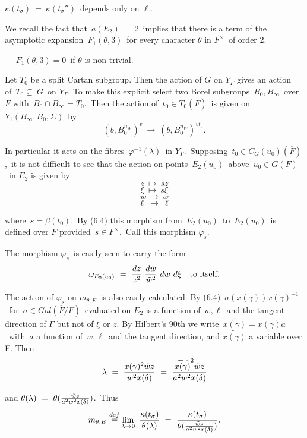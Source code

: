 \noindent $\kappa(t_\sigma)\ =\ \kappa(t_\sigma'')$\  depends only on
$\ell$.


We recall the fact that\ $a(E_2)\ =\ 2$\  implies that there is a term of the
asymptotic expansion\ $F_1(\theta, 3)$\  for every character $\theta$ in  $F^\times$\
of order 2.		    

\pagebreak
{}~~ $F_1(\theta,3) = 0$\  if  $\theta$  is non-trivial.
\endproclaim

  Let  $T_0$  be a split Cartan subgroup.  Then the action of  $G$ on
$Y_\Gamma$  gives an action of\ $T_0\subseteq\ G$\  on  $Y_\Gamma$.  To make this
explicit select two Borel subgroups\ $B_0,B_\infty$\  over  $F$  with\
$B_0 \cap B_\infty = T_0$.\  Then the action of\  $t_0\in T_0(\overline{F})$\  is
given on  $Y_1(B_\infty,B_0,\Sigma)$\  by
$$
(b, B_0^{n_W})^v\ \to\ (b, B_0^{n_W})^{v t_0} .
$$

\noindent In particular it acts on the fibres\ $\varphi^{-1}(\lambda)$\ in $Y_\Gamma$.\
Supposing\ $t_0\in C_G(u_0)(\overline{F})$,\ it is not difficult to see that the action on points\
$E_2(u_0)$\  above\ $u_0\in G(F)$\ in $E_2$ is given by
$$
z\ \longmapsto\ sz 
$$
$$
\xi\ \longmapsto\ s\xi
$$
$$
w\ \longmapsto\ w
$$
$$
\ell\ \longmapsto\ \ell
$$

\noindent  where\ $s = \beta(t_0)$.\  By (6.4) this morphism from\ $E_2(u_0)$\ to\
$E_2(u_0)$\  is defined over  $F$  provided\ $s\in F^\times$.\ Call this morphism
$\varphi_s$.

The morphism $\varphi_s$\ is easily seen to carry the form
$$
\omega_{E_2(u_0)}\ =\ {dz\over z^2}~ {d\tilde{w}\over \tilde{w}^2}~ dw~d\xi \quad {\text{to itself}}.
$$


\noindent  The action of  $\varphi_s$  on  $m_{\theta,E}$\  is also easily calculated.
By (6.4)\ $\sigma(x(\gamma))x(\gamma)^{-1}$\  for\ $\sigma\in Gal(\overline{F}/F)$\
evaluated on  $E_2$  is a function of\ $w,\ell$\  and the tangent direction of
$\Gamma$  but not of $\xi$  or  $z$.  By Hilbert's 90th we write\
${\widetilde{x(\gamma)}} = x(\gamma)a$\  with\ $a$ a function of\ $w, \ell$\ and
the  tangent direction, and $\widetilde{x(\gamma)}$ a variable over F.  Then
$$
\lambda\ =\ {{x(\gamma)^2\tilde{w}z}\over {w^2x(\delta)}}\ =\ {{{\widetilde{x(\gamma)}}^2\tilde{w}z}\over
{a^2w^2x(\delta)}}		 
$$

\noindent  and $\theta(\lambda)\ =\ \theta({{\tilde{w}z}\over {a^2w^2x(\delta)}})$.\  Thus
$$
m_{\theta,E}\ {\mathrel{\mathop=^{def}}}  \lim_{\lambda\to 0}\ {{\kappa(t_\sigma)}\over
{\theta(\lambda)}}\ =\ {{\kappa(t_\sigma)}\over {\theta({{\tilde{w}z}\over {a^2w^2x(\delta)}})}}.
$$

